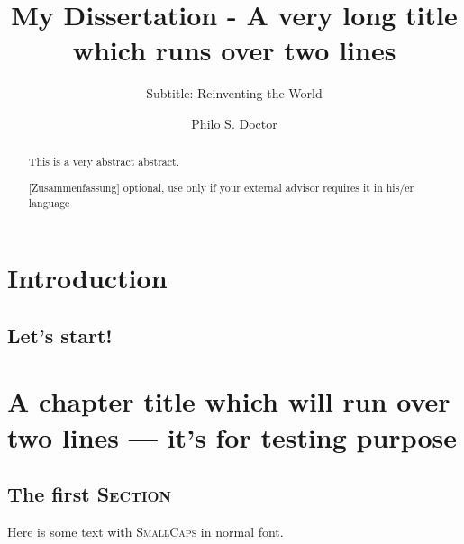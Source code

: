 \documentclass[]{usiinfthesis}
\title{My Dissertation - A very long title\\ which runs over two lines} %
\subtitle{Subtitle: Reinventing the World} %
\author{Philo S. Doctor} %
\begin{document}
\maketitle %

\frontmatter %

\begin{abstract}
This is a very abstract abstract. 

\lipsum
\end{abstract}

\begin{abstract}[Zusammenfassung]
optional, use only if your external advisor requires it in his/er
language 
\\

\lipsum
\end{abstract}

\begin{acknowledgements}
\lipsum 
\end{acknowledgements}

\tableofcontents 
\listoffigures %
\listoftables %

\mainmatter

\chapter{Introduction}
\lipsum[1-4]
\section{Let's start!}

\lipsum



\chapter[Short title]{A chapter title which will run over two lines --- it's for
  testing purpose}

\lipsum[1-2]

\section{The first \textsc{Section}}

Here is some text with \textsc{SmallCaps} in normal font.

\lipsum[3-4]
\end{document}
